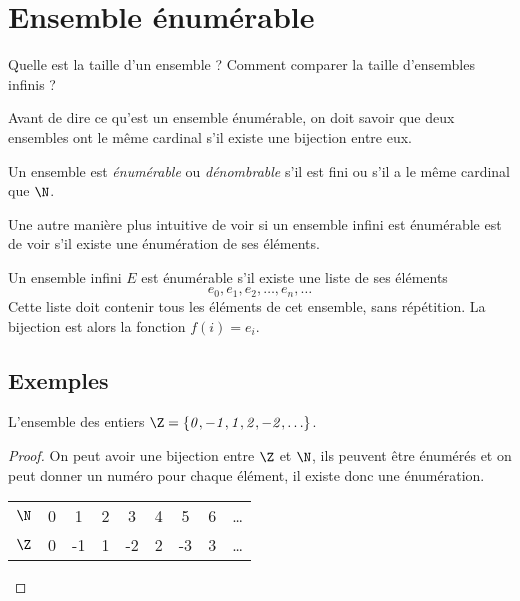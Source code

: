 
\section{Ensemble énumérable}
\label{sec:ensemble_num_rables}
Quelle est la taille d'un ensemble ?  Comment comparer la taille d'ensembles infinis ?

Avant de dire ce qu'est un ensemble énumérable, on doit savoir que deux ensembles
ont le même cardinal s'il existe une bijection entre eux.

\begin{mydef}
	Un ensemble est \emph{énumérable} ou \emph{dénombrable} s'il est fini ou s'il a le même cardinal que $\N$.
\end{mydef}
Une autre manière plus intuitive de voir si un ensemble infini est énumérable est de voir s'il existe une énumération de ses éléments.

\begin{myprop}
Un ensemble infini $E$ est énumérable s'il existe une liste de ses éléments
\[
e_0, e_1, e_2, \ldots , e_n, \ldots
\]
Cette liste doit contenir tous les éléments de cet ensemble, sans répétition.  La bijection est alors la fonction $f(i) = e_i$.
\end{myprop}

\subsection{Exemples}
\label{subsec:exemples}

\begin{myexem}
  L'ensemble des entiers $\mathit{\Z=\{0,-1,1,2,-2,\ldots\}}$.
  \begin{proof}
     On peut avoir une bijection entre $\Z$ et $\N$, ils peuvent être énumérés et on peut donner un numéro pour chaque élément, il existe donc une énumération.

  \begin{tabular}{ l | c c c c c c c r }
     $\N$ & 0 & 1 & 2  & 3 & 4 & 5 & 6 & \ldots \\
     $\Z$ & 0 & -1 & 1 & -2 & 2 & -3 & 3  & \ldots \\

    \end{tabular}
  \end{proof}
\end{myexem}

